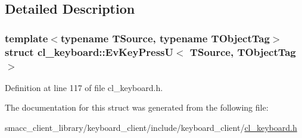 \subsection{Detailed Description}
\subsubsection*{template$<$typename T\+Source, typename T\+Object\+Tag$>$\newline
struct cl\+\_\+keyboard\+::\+Ev\+Key\+Press\+U$<$ T\+Source, T\+Object\+Tag $>$}



Definition at line 117 of file cl\+\_\+keyboard.\+h.



The documentation for this struct was generated from the following file\+:\begin{DoxyCompactItemize}
\item 
smacc\+\_\+client\+\_\+library/keyboard\+\_\+client/include/keyboard\+\_\+client/\hyperlink{cl__keyboard_8h}{cl\+\_\+keyboard.\+h}\end{DoxyCompactItemize}
